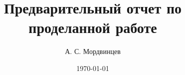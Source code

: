 \documentclass[a4paper,14pt]{extreport}
\begin{document}
\title{Предварительный отчет по проделанной работе}
\author{А. С. Мордвинцев}
\date{\today}


\sloppy  %

\maketitle

\setcounter{page}{3}

\tableofcontents








\end{document}
